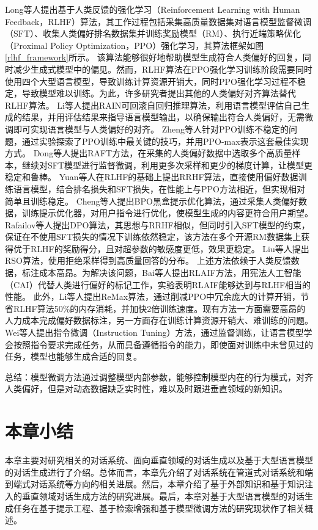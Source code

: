 Long等人\cite{DBLP:conf/nips/Ouyang0JAWMZASR22}提出基于人类反馈的强化学习（Reinforcement Learning with Human Feedback，RLHF）算法，其工作过程包括采集高质量数据集对语言模型监督微调（SFT）、收集人类偏好排名数据集并训练奖励模型（RM）、执行近端策略优化（Proximal Policy Optimization，PPO）强化学习，其算法框架如图\ref{rlhf_framework}所示。
该算法能够很好地帮助模型生成符合人类偏好的回复，同时减少生成式模型中的偏见。然而，RLHF算法在PPO强化学习训练阶段需要同时使用四个大型语言模型，导致训练计算资源开销大，同时PPO强化学习过程不稳定，导致模型难以训练。为此，许多研究者提出其他的人类偏好对齐算法替代RLHF算法。
Li等人\cite{DBLP:journals/corr/abs-2309-07124}提出RAIN可回滚自回归推理算法，利用语言模型评估自己生成的结果，并用评估结果来指导语言模型输出，以确保输出符合人类偏好，无需微调即可实现语言模型与人类偏好的对齐。
Zheng等人\cite{DBLP:journals/corr/abs-2307-04964}针对PPO训练不稳定的问题，通过实验探索了PPO训练中最关键的技巧，并用PPO-max表示这套最佳实现方式。
Dong等人\cite{DBLP:journals/corr/abs-2304-06767}提出RAFT方法，在采集的人类偏好数据中选取多个高质量样本，继续对SFT模型进行监督微调，利用更多次采样和更少的梯度计算，让模型更稳定和鲁棒。
Yuan等人\cite{DBLP:journals/corr/abs-2304-05302}在RLHF的基础上提出RRHF算法，直接使用偏好数据训练语言模型，结合排名损失和SFT损失，在性能上与PPO方法相近，但实现相对简单且训练稳定。
Cheng等人\cite{DBLP:journals/corr/abs-2311-04155}提出BPO黑盒提示优化算法，通过采集人类偏好数据，训练提示优化器，对用户指令进行优化，使模型生成的内容更符合用户期望。
Rafailov等人\cite{DBLP:conf/nips/RafailovSMMEF23}提出DPO算法，其思想与RRHF相似，但同时引入SFT模型的约束，保证在不使用SFT损失的情况下训练依然稳定，该方法在多个开源RM数据集上获得优于RLHF的奖励得分，且对超参数的敏感度更低，效果更稳定。
Liu等人\cite{DBLP:journals/corr/abs-2309-06657}提出RSO算法，使用拒绝采样得到高质量回答的分布。
上述方法依赖于人类反馈数据，标注成本高昂。为解决该问题，Bai等人\cite{DBLP:journals/corr/abs-2212-08073}提出RLAIF方法，用宪法人工智能（CAI）代替人类进行偏好的标记工作，实验表明RLAIF能够达到与RLHF相当的性能。
此外，Li等人\cite{DBLP:journals/corr/abs-2310-10505}提出ReMax算法，通过削减PPO中冗余庞大的计算开销，节省RLHF算法50\%的内存消耗，并加快2倍训练速度。现有方法一方面需要高昂的人力成本完成偏好数据标注，另一方面存在训练计算资源开销大、难训练的问题。
Wei等人\cite{DBLP:conf/iclr/WeiBZGYLDDL22}提出指令微调（Instruction Tuning）方法，通过监督训练，让语言模型学会按照指令要求完成任务，从而具备遵循指令的能力，即使面对训练中未曾见过的任务，模型也能够生成合适的回复。

总结：模型微调方法通过调整模型内部参数，能够控制模型内在的行为模式，对齐人类偏好，但是对动态数据缺乏实时性，难以及时跟进垂直领域的新知识。

\section{本章小结}

本章主要对研究相关的对话系统、面向垂直领域的对话生成以及基于大型语言模型的对话生成进行了介绍。总体而言，本章先介绍了对话系统在管道式对话系统和端到端式对话系统等方向的相关进展。然后，本章介绍了基于外部知识和基于知识注入的垂直领域对话生成方法的研究进展。最后，本章对基于大型语言模型的对话生成任务在基于提示工程、基于检索增强和基于模型微调方法的研究现状作了相关概述。